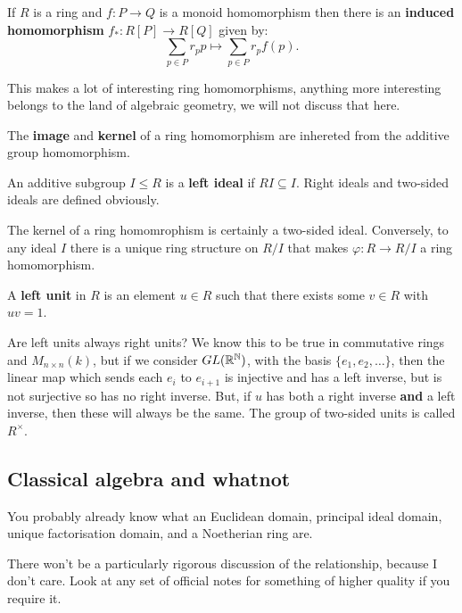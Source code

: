\documentclass{article}
\begin{document}
\begin{definition}
    If $R$ is a ring and $f:P\rightarrow Q$ is a monoid homomorphism then there is an \textbf{induced homomorphism} $f_* : R[P]\rightarrow R[Q]$ given by: \[
    \sum_{p\in P}r_p p \mapsto \sum_{p\in P} r_pf(p).
    \]
\end{definition}

This makes a lot of interesting ring homomorphisms, anything more interesting belongs to the land of algebraic geometry, we will not discuss that here.

The \textbf{image} and \textbf{kernel} of a ring homomorphism are inhereted from the additive group homomorphism.

\begin{definition}
    An additive subgroup $I\leq R$ is a \textbf{left ideal} if $RI \subseteq I$. Right ideals and two-sided ideals are defined obviously.
\end{definition}

The kernel of a ring homomrophism is certainly a two-sided ideal. Conversely, to any ideal $I$ there is a unique ring structure on $R/I$ that makes $\varphi:R\rightarrow R/I$ a ring homomorphism.

\begin{definition}
    A \textbf{left unit} in $R$ is an element $u\in R$ such that there exists some $v\in R$ with $uv =1$.
\end{definition}

Are left units always right units? We know this to be true in commutative rings and $M_{n\times n}(k)$, but if we consider $GL(\mathbb{R}^{\mathbb{N}})$, with the basis $\{e_1,e_2,\ldots\}$, then the linear map which sends each $e_i$ to $e_{i+1}$ is injective and has a left inverse, but is not surjective so has no right inverse. But, if $u$ has both a right inverse \textbf{and} a left inverse, then these will always be the same. The group of two-sided units is called $R^\times$.

\subsection{Classical algebra and whatnot}

You probably already know what an Euclidean domain, principal ideal domain, unique factorisation domain, and a Noetherian ring are.

There won't be a particularly rigorous discussion of the relationship, because I don't care. Look at any set of official notes for something of higher quality if you require it.
\end{document}
